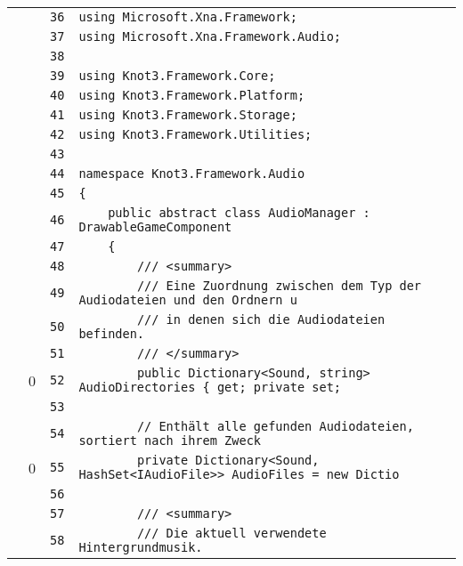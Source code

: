 \documentclass[a4paper,10pt]{article}
\begin{document}
\begin{longtable}[l]{lrrl}
\cellcolor{gray} &  & \verb~36~ & \verb~using Microsoft.Xna.Framework;~\\
\cellcolor{gray} &  & \verb~37~ & \verb~using Microsoft.Xna.Framework.Audio;~\\
\cellcolor{gray} &  & \verb~38~ & \verb~~\\
\cellcolor{gray} &  & \verb~39~ & \verb~using Knot3.Framework.Core;~\\
\cellcolor{gray} &  & \verb~40~ & \verb~using Knot3.Framework.Platform;~\\
\cellcolor{gray} &  & \verb~41~ & \verb~using Knot3.Framework.Storage;~\\
\cellcolor{gray} &  & \verb~42~ & \verb~using Knot3.Framework.Utilities;~\\
\cellcolor{gray} &  & \verb~43~ & \verb~~\\
\cellcolor{gray} &  & \verb~44~ & \verb~namespace Knot3.Framework.Audio~\\
\cellcolor{gray} &  & \verb~45~ & \verb~{~\\
\cellcolor{gray} &  & \verb~46~ & \verb~    public abstract class AudioManager : DrawableGameComponent~\\
\cellcolor{gray} &  & \verb~47~ & \verb~    {~\\
\cellcolor{gray} &  & \verb~48~ & \verb~        /// <summary>~\\
\cellcolor{gray} &  & \verb~49~ & \verb~        /// Eine Zuordnung zwischen dem Typ der Audiodateien und den Ordnern u~\\
\cellcolor{gray} &  & \verb~50~ & \verb~        /// in denen sich die Audiodateien befinden.~\\
\cellcolor{gray} &  & \verb~51~ & \verb~        /// </summary>~\\
\cellcolor{red} & 0 & \verb~52~ & \verb~        public Dictionary<Sound, string> AudioDirectories { get; private set; ~\\
\cellcolor{gray} &  & \verb~53~ & \verb~~\\
\cellcolor{gray} &  & \verb~54~ & \verb~        // Enthält alle gefunden Audiodateien, sortiert nach ihrem Zweck~\\
\cellcolor{red} & 0 & \verb~55~ & \verb~        private Dictionary<Sound, HashSet<IAudioFile>> AudioFiles = new Dictio~\\
\cellcolor{gray} &  & \verb~56~ & \verb~~\\
\cellcolor{gray} &  & \verb~57~ & \verb~        /// <summary>~\\
\cellcolor{gray} &  & \verb~58~ & \verb~        /// Die aktuell verwendete Hintergrundmusik.~\\

\end{longtable}
\end{document}
